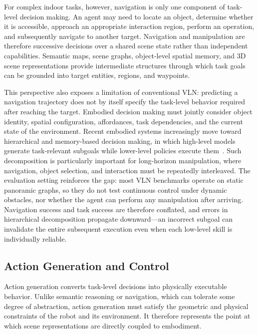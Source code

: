\documentclass{SCIS2026}
\begin{document}
For complex indoor tasks, however, navigation is only one component of task-level decision making. An agent may need to locate an object, determine whether it is accessible, approach an appropriate interaction region, perform an operation, and subsequently navigate to another target. Navigation and manipulation are therefore successive decisions over a shared scene state rather than independent capabilities. Semantic maps, scene graphs, object-level spatial memory, and 3D scene representations provide intermediate structures through which task goals can be grounded into target entities, regions, and waypoints.

This perspective also exposes a limitation of conventional VLN: predicting a navigation trajectory does not by itself specify the task-level behavior required after reaching the target. Embodied decision making must jointly consider object identity, spatial configuration, affordances, task dependencies, and the current state of the environment. Recent embodied systems increasingly move toward hierarchical and memory-based decision making, in which high-level models generate task-relevant subgoals while lower-level policies execute them~\cite{ahn2022saycan}. Such decomposition is particularly important for long-horizon manipulation, where navigation, object selection, and interaction must be repeatedly interleaved. The evaluation setting reinforces the gap: most VLN benchmarks operate on static panoramic graphs, so they do not test continuous control under dynamic obstacles, nor whether the agent can perform any manipulation after arriving.~\cite{hong2021vln,savva2019habitat} Navigation success and task success are therefore conflated, and errors in hierarchical decomposition propagate downward---an incorrect subgoal can invalidate the entire subsequent execution even when each low-level skill is individually reliable.

\subsection{Action Generation and Control}
Action generation converts task-level decisions into physically executable behavior. Unlike semantic reasoning or navigation, which can tolerate some degree of abstraction, action generation must satisfy the geometric and physical constraints of the robot and its environment. It therefore represents the point at which scene representations are directly coupled to embodiment.
\end{document}
